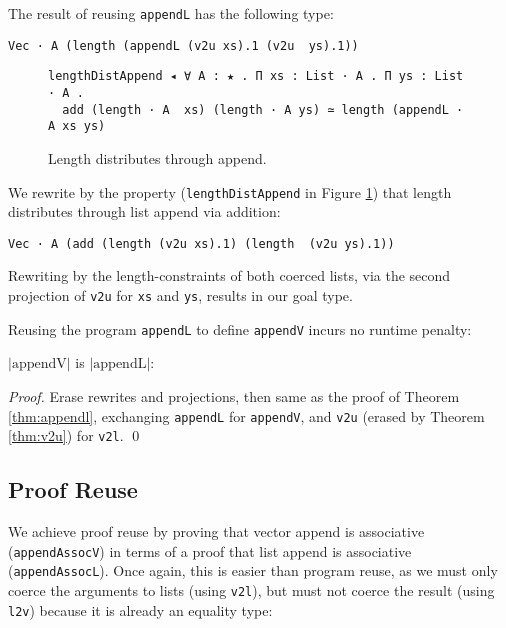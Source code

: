 \documentclass[a4paper,envcountsame,envcountsect]{llncs}
\newcommand{\reffig}[1]{Figure \ref{fig:#1}}
\newcommand{\labfig}[1]{\label{fig:#1}}
\newcommand{\refthm}[1]{Theorem \ref{thm:#1}}
\newcommand{\labthm}[1]{\label{thm:#1}}
\newcommand{\erase}[1]{\ensuremath{\lvert #1 \rvert}}
\newcommand{\name}[1]{\textrm{#1}}
\begin{document}
The result of reusing \texttt{appendL} has the following type:

\begin{verbatim}
Vec · A (length (appendL (v2u xs).1 (v2u  ys).1))
\end{verbatim}

\begin{figure}[t]
\centering
\begin{verbatim}
lengthDistAppend ◂ ∀ A : ★ . Π xs : List · A . Π ys : List · A .
  add (length · A  xs) (length · A ys) ≃ length (appendL · A xs ys)
\end{verbatim}
\caption{Length distributes through append.}
\labfig{lendistappend}
\end{figure}

We rewrite by the property
(\texttt{lengthDistAppend} in \reffig{lendistappend})
that length distributes through list
append via addition:

\begin{verbatim}
Vec · A (add (length (v2u xs).1) (length  (v2u ys).1))
\end{verbatim}

Rewriting by the length-constraints of both coerced lists, via
the second projection of \texttt{v2u} for \texttt{xs} and
\texttt{ys}, results in our goal type.

Reusing the program \texttt{appendL} to define \texttt{appendV} incurs
no runtime penalty:

\begin{theorem}
\erase{\name{appendV}} is \erase{\name{appendL}}:
\labthm{appendv}
\end{theorem}

\begin{proof}
{\small
  Erase rewrites and projections, then same as the proof of
  \refthm{appendl}, exchanging \texttt{appendL} for \texttt{appendV},
  and \texttt{v2u} (erased by \refthm{v2u}) for \texttt{v2l}. \qed
}
\end{proof}

\subsection{Proof Reuse}

We achieve proof reuse by proving that vector append is associative
(\texttt{appendAssocV}) in terms of a proof that
list append is associative (\texttt{appendAssocL}).
Once again, this is easier than program reuse, as we must only
coerce the arguments to lists (using \texttt{v2l}), but must not
coerce the result (using \texttt{l2v}) because it is already an
equality type:
\end{document}

